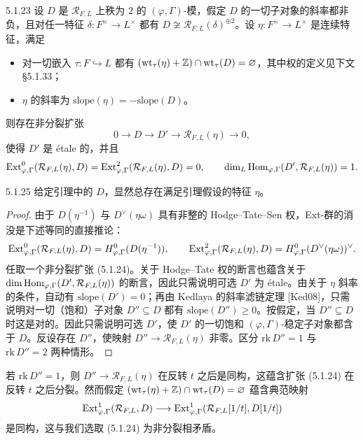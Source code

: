 \begin{lem}{5.1.23}\label{lem:a4-5-1-23}
设 $D$ 是 $\mathcal{R}_{F,L}$ 上秩为 $2$ 的 $(\varphi,\Gamma)$-模，假定 $D$ 的一切子对象的斜率都非负，且对任一特征 $\delta:F^\times\to L^\times$ 都有 $D\not\cong\mathcal{R}_{F,L}(\delta)^{\oplus2}$。设 $\eta:F^\times\to L^\times$ 是连续特征，满足
\begin{itemize}[leftmargin=1.8em,itemsep=0.15em]
\item 对一切嵌入 $\tau:F\hookrightarrow L$ 都有 $(\mathrm{wt}_\tau(\eta)+\mathbb{Z})\cap\mathrm{wt}_\tau(D)=\varnothing$，其中权的定义见下文 §5.1.33；
\item $\eta$ 的斜率为 $\mathrm{slope}(\eta)=-\mathrm{slope}(D)$。
\end{itemize}
则存在非分裂扩张
\begin{equation}
0\longrightarrow D\longrightarrow D'\longrightarrow\mathcal{R}_{F,L}(\eta)\longrightarrow0,\tag{5.1.24}
\end{equation}
使得 $D'$ 是 étale 的，并且
\[
\operatorname{Ext}^0_{\varphi,\Gamma}(\mathcal{R}_{F,L}(\eta),D)=\operatorname{Ext}^2_{\varphi,\Gamma}(\mathcal{R}_{F,L}(\eta),D)=0,\qquad
\dim_L\operatorname{Hom}_{\varphi,\Gamma}(D',\mathcal{R}_{F,L}(\eta))=1.
\]
\end{lem}

\begin{rem}{5.1.25}\label{rem:a4-5-1-25}
给定引理中的 $D$，显然总存在满足引理假设的特征 $\eta$。
\end{rem}

\begin{proof}
由于 $D(\eta^{-1})$ 与 $D^\vee(\eta\omega)$ 具有非整的 Hodge--Tate--Sen 权，Ext-群的消没是下述等同的直接推论：
\[
\operatorname{Ext}^0_{\varphi,\Gamma}(\mathcal{R}_{F,L}(\eta),D)=H^0_{\varphi,\Gamma}(D(\eta^{-1})),\qquad
\operatorname{Ext}^2_{\varphi,\Gamma}(\mathcal{R}_{F,L}(\eta),D)=H^0_{\varphi,\Gamma}(D^\vee(\eta\omega))^\vee.
\]
任取一个非分裂扩张 (5.1.24)。关于 Hodge--Tate 权的断言也蕴含关于 $\dim\operatorname{Hom}_{\varphi,\Gamma}(D',\mathcal{R}_{F,L}(\eta))$ 的断言，因此只需说明可选 $D'$ 为 étale。由关于 $\eta$ 斜率的条件，自动有 $\mathrm{slope}(D')=0$；再由 Kedlaya 的斜率滤链定理 [Ked08]，只需说明对一切（饱和）子对象 $D''\subseteq D$ 都有 $\mathrm{slope}(D'')\ge0$。按假定，当 $D''\subseteq D$ 时这是对的。因此只需说明可选 $D'$，使 $D'$ 的一切饱和 $(\varphi,\Gamma)$-稳定子对象都含于 $D$。反设存在 $D''$，使映射 $D''\to\mathcal{R}_{F,L}(\eta)$ 非零。区分 $\mathrm{rk}\,D''=1$ 与 $\mathrm{rk}\,D''=2$ 两种情形。
\end{proof}

若 $\mathrm{rk}\,D''=1$，则 $D''\to\mathcal{R}_{F,L}(\eta)$ 在反转 $t$ 之后是同构，这蕴含扩张 (5.1.24) 在反转 $t$ 之后分裂。然而假定 $(\mathrm{wt}_\tau(\eta)+\mathbb{Z})\cap\mathrm{wt}_\tau(D)=\varnothing$ 蕴含典范映射
\[
\operatorname{Ext}^1_{\varphi,\Gamma}(\mathcal{R}_{F,L},D)\longrightarrow\operatorname{Ext}^1_{\varphi,\Gamma}(\mathcal{R}_{F,L}[1/t],D[1/t])
\]
是同构，这与我们选取 (5.1.24) 为非分裂相矛盾。

